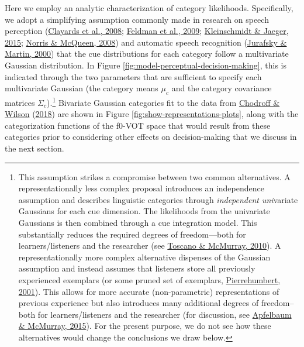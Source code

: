 \documentclass[
  11pt,
  english,
  man,floatsintext]{apa6}
\begin{document}
Here we employ an analytic characterization of category likelihoods. Specifically, we adopt a simplifying assumption commonly made in research on speech perception (\protect\hyperlink{ref-clayards2008}{Clayards et al., 2008}; \protect\hyperlink{ref-feldman2009}{Feldman et al., 2009}; \protect\hyperlink{ref-kleinschmidt-jaeger2015}{Kleinschmidt \& Jaeger, 2015}; \protect\hyperlink{ref-norris-mcqueen2008}{Norris \& McQueen, 2008}) and automatic speech recognition (\protect\hyperlink{ref-jurafsky-martin2000}{Jurafsky \& Martin, 2000}) that the cue distributions for each category follow a multivariate Gaussian distribution. In Figure \ref{fig:model-perceptual-decision-making}, this is indicated through the two parameters that are sufficient to specify each multivariate Gaussian (the category means \(\mu_c\) and the category covariance matrices \(\Sigma_c\)).\footnote{This assumption strikes a compromise between two common alternatives. A representationally less complex proposal introduces an independence assumption and describes linguistic categories through \emph{independent uni}variate Gaussians for each cue dimension. The likelihoods from the univariate Gaussians is then combined through a cue integration model. This substantially reduces the required degrees of freedom---both for learners/listeners and the researcher (see \protect\hyperlink{ref-toscano-mcmurray2010}{Toscano \& McMurray, 2010}). A representationally more complex alternative dispenses of the Gaussian assumption and instead assumes that listeners store all previously experienced exemplars (or some pruned set of exemplars, \protect\hyperlink{ref-pierrehumbert2001}{Pierrehumbert, 2001}). This allows for more accurate (non-parametric) representations of previous experience but also introduces many additional degrees of freedom--both for learners/listeners and the researcher (for discussion, see \protect\hyperlink{ref-apfelbaum-mcmurray2015}{Apfelbaum \& McMurray, 2015}). For the present purpose, we do not see how these alternatives would change the conclusions we draw below.} Bivariate Gaussian categories fit to the data from \protect\hyperlink{ref-chodroff-wilson2018}{Chodroff \& Wilson} (\protect\hyperlink{ref-chodroff-wilson2018}{2018}) are shown in Figure \ref{fig:show-representations-plots}, along with the categorization functions of the f0-VOT space that would result from these categories prior to considering other effects on decision-making that we discuss in the next section.
\end{document}
